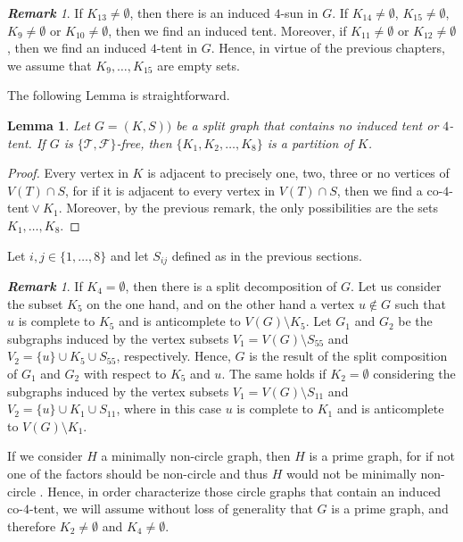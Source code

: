 \documentclass[12pt]{book}
\theoremstyle{plain}
\newtheorem{lema}[teo]{Lemma}
\theoremstyle{remark}
\newtheorem{remark}[teo]{\textbf{\textit{Remark}}}
\begin{document}
\begin{remark} \label{obs:co4tent_0}
	If $K_{13} \neq \emptyset$, then there is an induced $4$-sun in $G$.
	If $K_{14} \neq \emptyset$, $K_{15} \neq \emptyset$, $K_{9} \neq \emptyset$ or $K_{10} \neq \emptyset$, then we find an induced tent.
	Moreover, if $K_{11} \neq \emptyset$ or $K_{12} \neq \emptyset$, then we find an induced $4$-tent in $G$.
	Hence, in virtue of the previous chapters, we assume that $K_9, \ldots, K_{15}$ are empty sets.
\end{remark} 

The following Lemma is straightforward.

\begin{lema}\label{lema:co4tent_0}
	Let $G=(K,S))$ be a split graph that contains no induced tent or $4$-tent. If $G$ is $\{ \mathcal{T}, \mathcal{F} \}$-free, then $\{K_1, K_2, \ldots, K_8\}$ is a partition of $K$.
\end{lema}

\begin{proof}
Every vertex in $K$ is adjacent to precisely one, two, three or no vertices of $V(T)\cap S$, for if it is adjacent to every vertex in $V(T) \cap S$, then we find a co-$4$-tent${}\vee{}K_1$. Moreover, by the previous remark, the only possibilities are the sets $K_1, \ldots, K_8$.
\end{proof}

Let $i,j \in \{1, \ldots, 8\}$ and let $S_{ij}$ defined as in the previous sections.

\begin{remark} \label{obs:co4tent_1}
If $K_4 = \emptyset$, then there is a split decomposition of $G$. Let us consider the subset $K_5$ on the one hand, and on the other hand a vertex $u \not\in G$ such that $u$ is complete to $K_5$ and is anticomplete to $V(G) \setminus K_5$. Let $G_1$ and $G_2$ be the subgraphs induced by the vertex subsets $V_1 = V(G) \setminus S_{55}$ and $V_2 = \{u\} \cup K_5 \cup S_{55}$, respectively. Hence, $G$ is the result of the split composition of $G_1$ and $G_2$ with respect to $K_5$ and $u$. The same holds if $K_2 = \emptyset$ considering the subgraphs induced by the vertex subsets $V_1 = V(G) \setminus S_{11}$ and $V_2 = \{u\} \cup K_1 \cup S_{11}$, where in this case $u$ is complete to $K_1$ and is anticomplete to $V(G) \setminus K_1$.
	
	If we consider $H$ a minimally non-circle graph, then $H$ is a prime graph, for if not one of the factors should be non-circle and thus $H$ would not be minimally non-circle \cite{B94}. Hence, in order characterize those circle graphs that contain an induced co-$4$-tent, we will assume without loss of generality that $G$ is a prime graph, and therefore $K_2 \neq \emptyset$ and $K_4 \neq \emptyset$. 
\end{remark}
\end{document}
